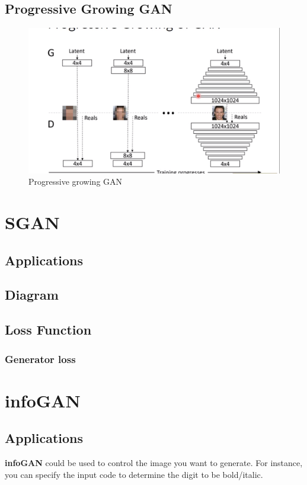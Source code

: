 \documentclass{article}
\begin{document}
\begin{itemize}
\subsection{Progressive Growing GAN}
\begin{figure}[H]
    \centering
    \includegraphics[width=\linewidth]{ProgressiveGAN}
    \caption{Progressive growing GAN}
\end{figure}
\section{SGAN}
\subsection{Applications}
\subsection{Diagram}
\subsection{Loss Function}
\subsubsection{Generator loss}
\section{infoGAN}
\subsection{Applications}
\textbf{infoGAN} could be used to control the image you want to generate. For instance, you can specify the input code to determine the digit to be bold/italic.

\end{itemize}
\end{document}
